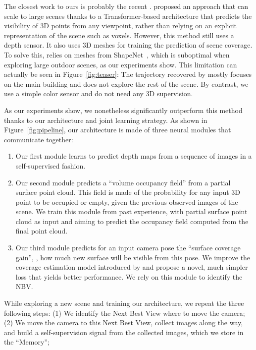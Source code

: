 The closest work to ours is probably the recent \cite{guedon-nips22-scone-surface-coverage}. \cite{guedon-nips22-scone-surface-coverage} proposed an approach that can scale to large scenes thanks to a Transformer-based architecture that predicts the visibility of 3D points from any viewpoint, rather than relying on an explicit representation of the scene such as voxels. However, this method still uses a depth sensor. It also uses 3D meshes for training the prediction of scene coverage. To solve this, \cite{guedon-nips22-scone-surface-coverage} relies on meshes from ShapeNet~\cite{chang-15-shapenet}, which is suboptimal when exploring large outdoor scenes, as our experiments show. This limitation can actually be seen in Figure~\ref{fig:teaser}: The trajectory recovered by \cite{guedon-nips22-scone-surface-coverage} mostly focuses on the main building and does not explore the rest of the scene. By contrast, we use a simple color sensor and do not need any 3D supervision. 



As our experiments show, we nonetheless significantly outperform this method thanks to our architecture and joint learning strategy. As shown in Figure~\ref{fig:pipeline}, our architecture is made of three neural modules that communicate together:
%
\begin{enumerate}[align=left,labelsep=0cm,itemindent=-1mm,noitemsep]
\item Our first module learns to predict depth maps from a sequence of images in a self-supervised fashion. 
%
\item Our second module predicts a ``volume occupancy field'' from a partial surface point cloud. This field is made of the probability for any input 3D point to be occupied or empty, given the previous observed images of the scene. We train this module from past experience, with partial surface point cloud as input and aiming to predict the occupancy field computed from the final point cloud.
\item Our third module predicts for an input camera pose the ``surface coverage gain'', \ie, how much new surface will be visible from this pose. We improve the coverage estimation model introduced by \cite{guedon-nips22-scone-surface-coverage} and propose a novel, much simpler loss that yields better performance. We rely on this module to identify the NBV.
\end{enumerate}


While exploring a new scene and training our architecture, we repeat the three following steps:
(1) We identify the Next Best View where to move the camera; 
(2) We move the camera to this Next Best View, collect images along the way, and build a self-supervision signal from the collected images, which we store in the ``Memory'';

